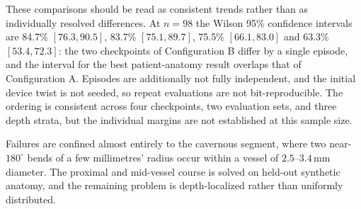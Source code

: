 These comparisons should be read as consistent trends rather than as individually resolved
differences. At $n = 98$ the Wilson 95\% confidence intervals are
84.7\% $[76.3, 90.5]$, 83.7\% $[75.1, 89.7]$, 75.5\% $[66.1, 83.0]$ and 63.3\% $[53.4, 72.3]$: the
two checkpoints of Configuration B differ by a single episode, and the interval for the best
patient-anatomy result overlaps that of Configuration A. Episodes are additionally not fully
independent, and the initial device twist is not seeded, so repeat evaluations are not
bit-reproducible. The ordering is consistent across four checkpoints, two evaluation sets, and
three depth strata, but the individual margins are not established at this sample size.

Failures are confined almost entirely to the cavernous segment, where two near-$180^\circ$ bends
of a few millimetres' radius occur within a vessel of $2.5$--$3.4$\,mm diameter. The proximal and
mid-vessel course is solved on held-out synthetic anatomy, and the remaining problem is
depth-localized rather than uniformly distributed.
